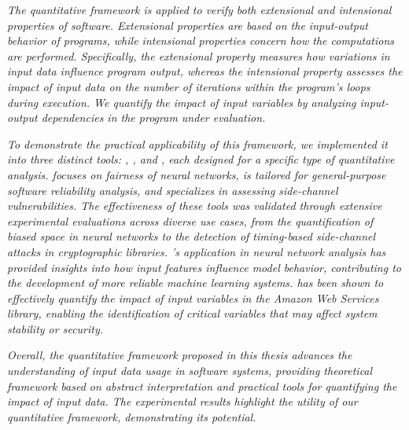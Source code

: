 \emph{
The quantitative framework is applied to verify both extensional and intensional properties of software. Extensional properties are based on the input-output behavior of programs, while intensional properties concern how the computations are performed. Specifically, the extensional property measures how variations in input data influence program output, whereas the intensional property assesses the impact of input data on the number of iterations within the program's loops during execution.
We quantify the impact of input variables by analyzing input-output dependencies in the program under evaluation.}

\emph{
To demonstrate the practical applicability of this framework, we implemented it into three distinct tools: \libra, \impatto, and \timesec, each designed for a specific type of quantitative analysis. \libra{} focuses on fairness of neural networks, \impatto{} is tailored for general-purpose software reliability analysis, and \timesec{} specializes in assessing side-channel vulnerabilities. The effectiveness of these tools was validated through extensive experimental evaluations across diverse use cases, from the quantification of biased space in neural networks to the detection of timing-based side-channel attacks in cryptographic libraries.
\libra's application in neural network analysis has provided insights into how input features influence model behavior, contributing to the development of more reliable machine learning systems.
\timesec{} has been shown to effectively quantify the impact of input variables in the Amazon Web Services \bignum{} library, enabling the identification of critical variables that may affect system stability or security.}

\emph{
Overall, the quantitative framework proposed in this thesis advances the understanding of input data usage in software systems, providing theoretical framework based on abstract interpretation and practical tools for quantifying the impact of input data. The experimental results highlight the utility of our quantitative framework, demonstrating its potential.}

